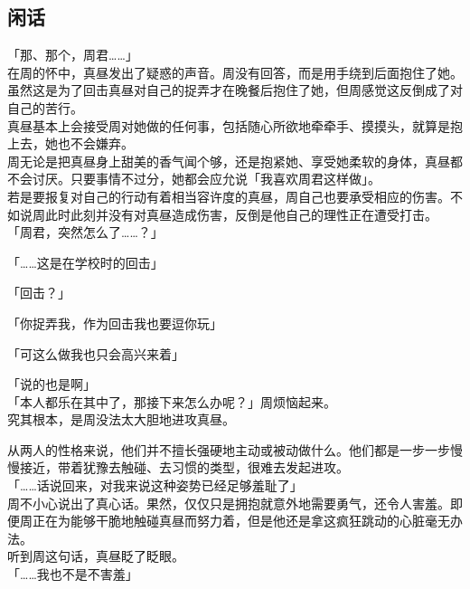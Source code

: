 \subsection{闲话}

「那、那个，周君……」\\

在周的怀中，真昼发出了疑惑的声音。周没有回答，而是用手绕到后面抱住了她。\\

虽然这是为了回击真昼对自己的捉弄才在晚餐后抱住了她，但周感觉这反倒成了对自己的苦行。\\

真昼基本上会接受周对她做的任何事，包括随心所欲地牵牵手、摸摸头，就算是抱上去，她也不会嫌弃。\\

周无论是把真昼身上甜美的香气闻个够，还是抱紧她、享受她柔软的身体，真昼都不会讨厌。只要事情不过分，她都会应允说「我喜欢周君这样做」。\\

若是要报复对自己的行动有着相当容许度的真昼，周自己也要承受相应的伤害。不如说周此时此刻并没有对真昼造成伤害，反倒是他自己的理性正在遭受打击。\\

「周君，突然怎么了……？」

「……这是在学校时的回击」

「回击？」

「你捉弄我，作为回击我也要逗你玩」

「可这么做我也只会高兴来着」

「说的也是啊」\\

「本人都乐在其中了，那接下来怎么办呢？」周烦恼起来。\\

究其根本，是周没法太大胆地进攻真昼。

从两人的性格来说，他们并不擅长强硬地主动或被动做什么。他们都是一步一步慢慢接近，带着犹豫去触碰、去习惯的类型，很难去发起进攻。\\

「……话说回来，对我来说这种姿势已经足够羞耻了」\\

周不小心说出了真心话。果然，仅仅只是拥抱就意外地需要勇气，还令人害羞。即便周正在为能够干脆地触碰真昼而努力着，但是他还是拿这疯狂跳动的心脏毫无办法。\\

听到周这句话，真昼眨了眨眼。\\

「……我也不是不害羞」

